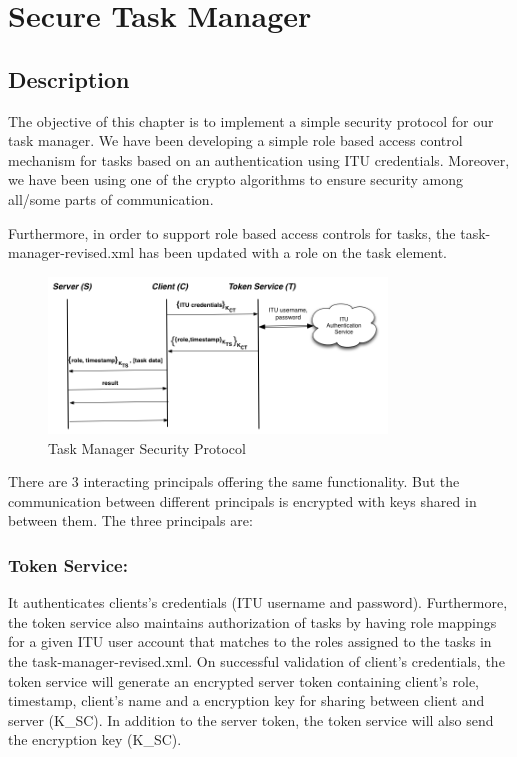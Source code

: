 
\section*{Secure Task Manager}

\subsection*{Description}

The objective of this chapter is to implement a simple security protocol for our task manager. We have been developing a simple role based access control mechanism for tasks based on an authentication using ITU credentials. Moreover, we have been using one of the crypto algorithms to ensure security among all/some parts of communication.

Furthermore, in order to support role based access controls for tasks,  the task-manager-revised.xml has been updated with a role on the task element.

\begin{figure}[ht!]
	\centering
		\includegraphics[width=90mm]{graphics/task-manager-security-protocol.png}
		\caption{Task Manager Security Protocol}
		\label{overflow}
\end{figure}

There are 3 interacting principals offering  the same functionality. But the communication between different principals is encrypted with keys shared in between them. The three principals are:

\subsubsection*{Token Service:} It authenticates clients’s credentials (ITU username and password). Furthermore, the token service also maintains authorization of tasks by having role mappings for a given ITU user account that matches to the roles assigned to the tasks in the task-manager-revised.xml. On successful validation  of client’s credentials, the token service will generate an encrypted server token containing client’s role, timestamp, client’s name and a encryption key for sharing between client and server (K_SC). In addition to the server token, the token service will also send the encryption key (K_SC).


